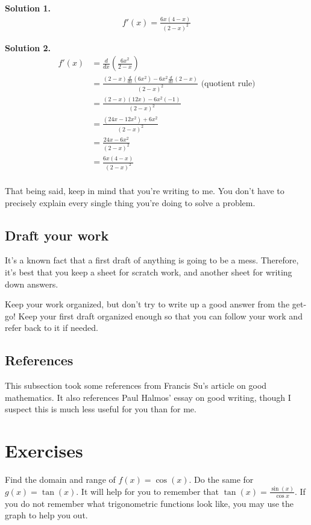 \documentclass{scrbook}
\theoremstyle{definition}
\newenvironment{exercise}[1]{%
  \renewcommand\theexerciseinner{#1}%
  \exerciseinner
}{\endexerciseinner}
\begin{document}
\textbf{Solution 1.}
\begin{align*}
    f'(x) = \frac{6x(4-x)}{(2-x)^2}
\end{align*}

\textbf{Solution 2.}
\begin{align*}
    f'(x) &= \frac{d}{dx}\left(\frac{6x^2}{2-x}\right)\\
        &= \frac{(2-x)\frac{d}{dx}(6x^2) - 6x^2\frac{d}{dx}(2-x)}{(2-x)^2} \text{ (quotient rule)}\\
        &= \frac{(2-x)(12x) - 6x^2(-1)}{(2-x)^2}\\
        &= \frac{(24x-12x^2) + 6x^2}{(2-x)^2}\\
        &= \frac{24x-6x^2}{(2-x)^2}\\
        &= \frac{6x(4-x)}{(2-x)^2}\\
\end{align*}

That being said, keep in mind that you're writing to me. You don't have to precisely explain every single thing you're doing to solve a problem. 

\subsection{Draft your work}

It's a known fact that a first draft of anything is going to be a mess. Therefore, it's best that you keep a sheet for scratch work, and another sheet for writing down answers. 

Keep your work organized, but don't try to write up a good answer from the get-go! Keep your first draft organized enough so that you can follow your work and refer back to it if needed.

\subsection{References}

This subsection took some references from Francis Su's \cite{su:2015} article on good mathematics. It also references Paul Halmos' \cite{halmos} essay on good writing, though I suspect this is much less useful for you than for me. 

\section{Exercises}

\begin{exercise}{1.5.1}
Find the domain and range of $f(x) = \cos(x)$. Do the same for $g(x) = \tan(x)$. It will help for you to remember that $\tan(x) = \frac{\sin(x)}{\cos{x}}$. If you do not remember what trigonometric functions look like, you may use the graph to help you out. 
\end{exercise}
\end{document}
